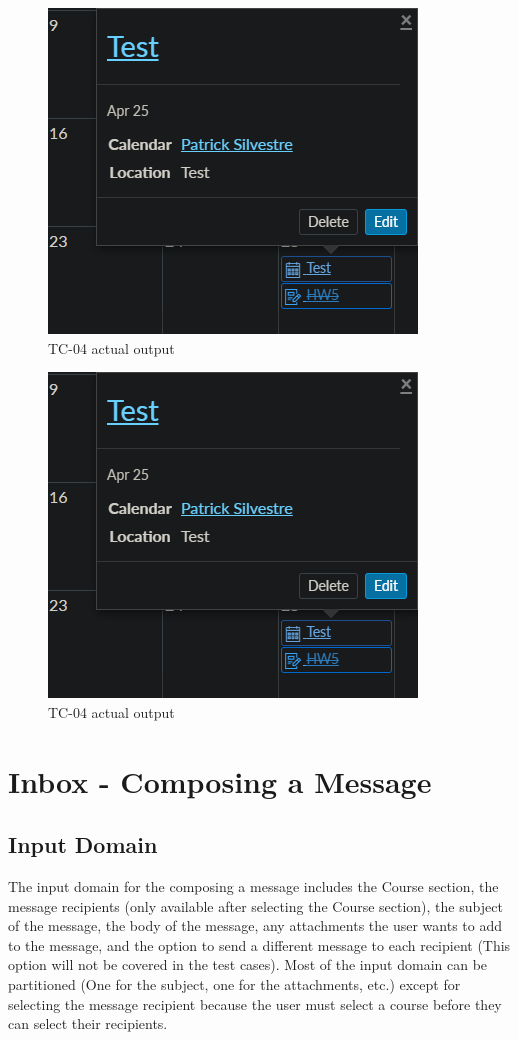 \documentclass[10pt,letterpaper]{article}
\begin{document}
\begin{figure}[!htb]
	\centerline{\includegraphics[]{screenshots/tc04-actual-output.png}}
	\caption{TC-04 actual output}
\end{figure}
\pagebreak
\begin{figure}[!htb]
	\centerline{\includegraphics[]{screenshots/tc04-actual-output.png}}
	\caption{TC-04 actual output}
\end{figure}

\newpage
\section{Inbox - Composing a Message}
\subsection{Input Domain}
The input domain for the composing a message includes the Course section, the message recipients (only available after selecting the Course section), the subject of the message, the body of the message, any attachments the user wants to add to the message, and the option to send a different message to each recipient (This option will not be covered in the test cases).
Most of the input domain can be partitioned (One for the subject, one for the attachments, etc.) except for selecting the message recipient because the user must select a course before they can select their recipients.
\end{document}
